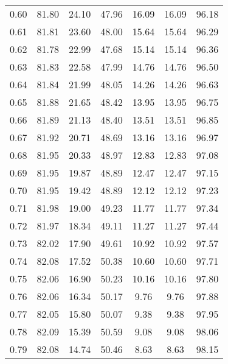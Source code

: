 \begin{tabular}{|c|c|c|c|c|c|c|}
      0.60 &     81.80 &     24.10 &      47.96 &   16.09 &      16.09 &         96.18 \\
      0.61 &     81.81 &     23.60 &      48.00 &   15.64 &      15.64 &         96.29 \\
      0.62 &     81.78 &     22.99 &      47.68 &   15.14 &      15.14 &         96.36 \\
      0.63 &     81.83 &     22.58 &      47.99 &   14.76 &      14.76 &         96.50 \\
      0.64 &     81.84 &     21.99 &      48.05 &   14.26 &      14.26 &         96.63 \\
      0.65 &     81.88 &     21.65 &      48.42 &   13.95 &      13.95 &         96.75 \\
      0.66 &     81.89 &     21.13 &      48.40 &   13.51 &      13.51 &         96.85 \\
      0.67 &     81.92 &     20.71 &      48.69 &   13.16 &      13.16 &         96.97 \\
      0.68 &     81.95 &     20.33 &      48.97 &   12.83 &      12.83 &         97.08 \\
      0.69 &     81.95 &     19.87 &      48.89 &   12.47 &      12.47 &         97.15 \\
      0.70 &     81.95 &     19.42 &      48.89 &   12.12 &      12.12 &         97.23 \\
      0.71 &     81.98 &     19.00 &      49.23 &   11.77 &      11.77 &         97.34 \\
      0.72 &     81.97 &     18.34 &      49.11 &   11.27 &      11.27 &         97.44 \\
      0.73 &     82.02 &     17.90 &      49.61 &   10.92 &      10.92 &         97.57 \\
      0.74 &     82.08 &     17.52 &      50.38 &   10.60 &      10.60 &         97.71 \\
      0.75 &     82.06 &     16.90 &      50.23 &   10.16 &      10.16 &         97.80 \\
      0.76 &     82.06 &     16.34 &      50.17 &    9.76 &       9.76 &         97.88 \\
      0.77 &     82.05 &     15.80 &      50.07 &    9.38 &       9.38 &         97.95 \\
      0.78 &     82.09 &     15.39 &      50.59 &    9.08 &       9.08 &         98.06 \\
      0.79 &     82.08 &     14.74 &      50.46 &    8.63 &       8.63 &         98.15 \\

\end{tabular}

